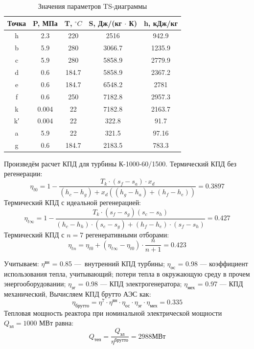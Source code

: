 \begin{table}[H]
	\caption{Значения параметров TS-диаграммы}
	\begin{center}
        \begin{tabular}{|c|c|c|c|c|}
        \toprule
         Точка & P, МПа & T, $^\circ C$ & S, Дж/(кг $\cdot$ К) & h, кДж/кг \\ 
         \midrule
         \hline
          h & 2.3 & 220 & 2516 & 942.9\\ 
         \hline
          b & 5.9 & 280 & 3066.7 & 1235.9 \\ 
         \hline
          c & 5.9 & 280 & 5858.9 & 2779.9\\ 
         \hline
          d & 0.6 & 184.7 & 5858.9 & 2367.2 \\ 
         \hline
          e & 0.6 & 184.7 & 6548.2 & 2781 \\ 
         \hline
          f & 0.6 & 250  & 7182.8 & 2957.3 \\ 
         \hline
          k & 0.004 & 22 & 7182.8 & 2163.7 \\ 
         \hline
          k′ & 0.004 & 22 & 322.8 & 91.7 \\ 
         \hline
          a & 5.9  & 22 & 321.5 & 97.16 \\ 
         \hline
          g & 0.6 & 184.7 &  2183.5 & 783.3 \\ 
         \bottomrule
		\end{tabular}
		\label{tabular:coeffs}
	\end{center}
\end{table}

Произведём расчет КПД для турбины К-1000-60/1500. Термический КПД без регенерации:
$$
η_{t0} = 1 -
\frac{T_{k} ⋅ \left( s_{f} - s_{a} \right) ⋅ x_{d}}
{\left( h_{c} - h_{g} \right) +x_{d}\left( \left( h_{g} - h_{a} \right) + \left( h_{f} - h_{e} \right) \right)} = 0.3897
$$
Термический КПД с идеальной регенерацией:
$$
η_{t∞} = 1 -
\frac{T_{k} ⋅ \left( s_{f} - s_{g} \right) \left( s_{c} - s_{h} \right)}
{\left(h_{c} - h_{h}\right) ⋅ \left( s_{e} - s_{g} \right) + \left( h_{f} - h_{e} \right) ⋅ \left( s_{f} - s_{h} \right)} = 0.427
$$
Термический КПД с $n = 7$  регенеративными отборами:
$$
η_{tn} = η_{t0} + \left( η_{t∞} - η_{t0} \right) ⋅ \frac{n}{n+1} = 0.423
$$

Учитываем:
$\eta^{\text{вн}}$ = 0.85 — внутренний КПД турбины;
$\eta_{\text{ос}}$ = 0.98 — коэффициент использования тепла, учитывающий; потери тепла в окружающую среду в прочем энергооборудовании;
$\eta_{\text{эг}}$ = 0.98 — КПД электрогенератора;
$\eta_{\text{мех}}$ = 0.97 — КПД механический,
Вычисляем КПД брутто АЭС как:
$$
\eta_{\text{брутто}} = \eta^7 \cdot \eta^{\text{вн}} \cdot \eta_{\text{ос}} \cdot \eta_{\text{эг}} \cdot \eta_{\text{мех}} = 0.335
$$
Тепловая мощность реактора при номинальной электрической мощности $Q_{\text{эл}} = 1000$ МВт равна:
$$
Q_{\text{теп}} = \frac {Q_{\text{эл}}} {\eta^{\text{брутто}}} = 2988 МВт 
$$


